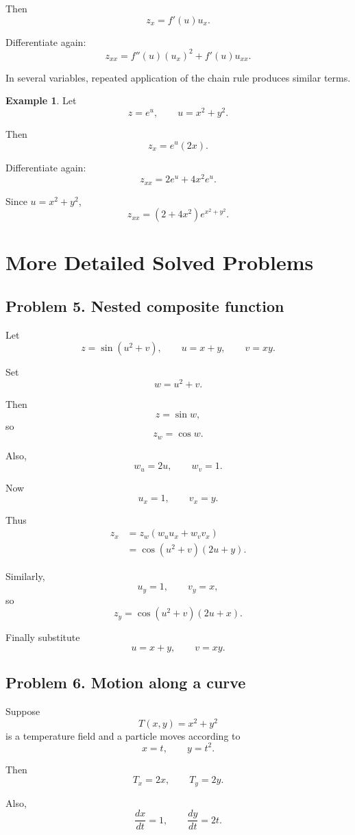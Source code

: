 \documentclass[11pt,oneside]{book}
\theoremstyle{studentthm}
\theoremstyle{definition}
\newtheorem{example}[theorem]{Example}
\begin{document}
Then
\[
z_x=f'(u)u_x.
\]

Differentiate again:
\[
z_{xx}
=
f''(u)(u_x)^2
+
f'(u)u_{xx}.
\]

In several variables, repeated application of the chain rule produces
similar terms.

\begin{example}
Let
\[
z=e^u,
\qquad
u=x^2+y^2.
\]

Then
\[
z_x=e^u(2x).
\]

Differentiate again:
\[
z_{xx}
=
2e^u
+
4x^2e^u.
\]

Since \(u=x^2+y^2\),
\[
z_{xx}
=
(2+4x^2)e^{x^2+y^2}.
\]
\end{example}

\section{More Detailed Solved Problems}

\subsection*{Problem 5. Nested composite function}

Let
\[
z=\sin(u^2+v),
\qquad
u=x+y,
\qquad
v=xy.
\]

Set
\[
w=u^2+v.
\]

Then
\[
z=\sin w,
\]
so
\[
z_w=\cos w.
\]

Also,
\[
w_u=2u,
\qquad
w_v=1.
\]

Now
\[
u_x=1,\qquad v_x=y.
\]

Thus
\[
\begin{aligned}
z_x
&=
z_w(w_u u_x+w_v v_x)\\
&=
\cos(u^2+v)(2u+y).
\end{aligned}
\]

Similarly,
\[
u_y=1,\qquad v_y=x,
\]
so
\[
z_y
=
\cos(u^2+v)(2u+x).
\]

Finally substitute
\[
u=x+y,\qquad v=xy.
\]

\subsection*{Problem 6. Motion along a curve}

Suppose
\[
T(x,y)=x^2+y^2
\]
is a temperature field and a particle moves according to
\[
x=t,\qquad y=t^2.
\]

Then
\[
T_x=2x,\qquad T_y=2y.
\]

Also,
\[
\frac{dx}{dt}=1,
\qquad
\frac{dy}{dt}=2t.
\]
\end{document}
